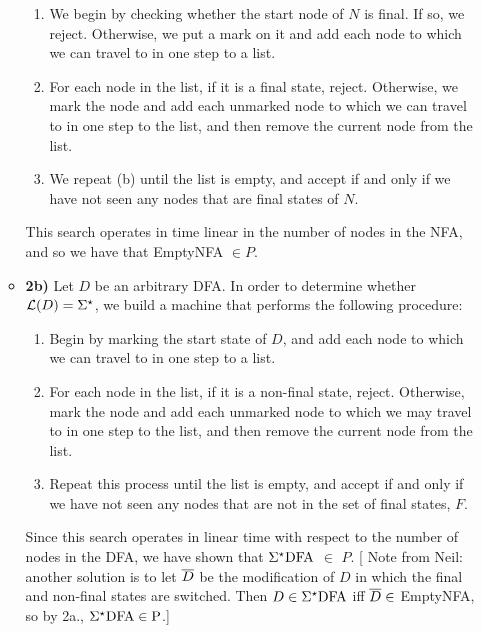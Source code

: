 \documentclass[12pt]{article}
\begin{document}
\begin{enumerate}
\begin{itemize}
\begin{enumerate}

\item We begin by checking whether the start node of $N$ is final. If so, we reject. Otherwise, we put a mark on it and add each node to which we can travel to in one step to a list. 

\item For each node in the list, if it is a final state, reject. Otherwise, we mark the node and add each unmarked node to which we can travel to in one step to the list, and then remove the current node from the list.

\item We repeat (b) until the list is empty, and accept if and only if we have not seen any nodes that are final states of $N$. 

\end{enumerate}

This search operates in time linear in the number of nodes in the NFA, and so we have that EmptyNFA $\in P$.

\item \textbf{2b)} Let $D$ be an arbitrary DFA. In order to determine whether ${{\cal L}(D) = \Sigma^\star}$, we build a machine that performs the following procedure:

\begin{enumerate} 

\item Begin by marking the start state of $D$, and add each node to which we can travel to in one step to a list.

\item For each node in the list, if it is a non-final state, reject. Otherwise, mark the node and add each unmarked node to which we may travel to in one step to the list, and then remove the current node from the list.  

\item Repeat this process until the list is empty, and accept if and only if we have not seen any nodes that are not in the set of final states, $F$.

\end{enumerate}

Since this search operates in linear time with respect to the number of nodes in the DFA, we have
shown that $\Sigma^\star\mbox{{\rm DFA}}$ $\in$ $P$.  [{\color{blue} Note from Neil: another solution
    is to let $\overline{D}$ be the modification of $D$ in which the final and non-final states are
    switched.  Then $D\in \Sigma^\star\mbox{{\rm DFA}}$ iff $\overline{D} \in $ EmptyNFA, so by 2a., 
   $\Sigma^\star\mbox{{\rm DFA}}\in \mbox{{\rm P}}$.}]


\end{itemize}
\end{enumerate}
\end{document}
